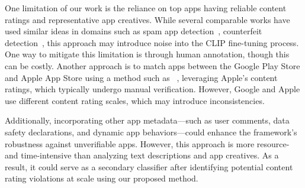 One limitation of our work is the reliance on top apps having reliable content ratings and representative app creatives. While several comparable works have used similar ideas in domains such as spam app detection~\cite{seneviratne2015early}, counterfeit detection~\cite{karunanayake2020multi}, this approach may introduce noise into the CLIP fine-tuning process. One way to mitigate this limitation is through human annotation, though this can be costly. Another approach is to match apps between the Google Play Store and Apple App Store using a method such as ~\cite{steinbock2024comparing}, leveraging Apple's content ratings, which typically undergo manual verification. However, Google and Apple use different content rating scales, which may introduce inconsistencies.

Additionally, incorporating other app metadata—such as user comments, data safety declarations, and dynamic app behaviors—could enhance the framework’s robustness against unverifiable apps. However, this approach is more resource- and time-intensive than analyzing text descriptions and app creatives. As a result, it could serve as a secondary classifier after identifying potential content rating violations at scale using our proposed method.
